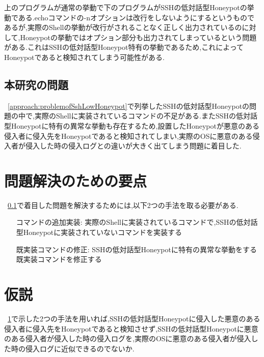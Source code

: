 上のプログラムが通常の挙動で下のプログラムがSSHの低対話型Honeypotの挙動である.echoコマンドの-nオプションは改行をしないようにするというものであるが,実際のShellの挙動が改行がされることなく正しく出力されているのに対して,Honeypotの挙動ではオプション部分も出力されてしまっているという問題がある.これはSSHの低対話型Honeypot特有の挙動であるため,これによってHoneypotであると検知されてしまう可能性がある.


\subsection{本研究の問題}
\label{approach:subproblem}
~\ref{approach:problemofSshLowHoneypot}で列挙したSSHの低対話型Honeypotの問題の中で,実際のShellに実装されているコマンドの不足がある.またSSHの低対話型Honeypotに特有の異常な挙動も存在するため,設置したHoneypotが悪意のある侵入者に侵入先をHoneypotであると検知されてしまい,実際のOSに悪意のある侵入者が侵入した時の侵入ログとの違いが大きく出てしまう問題に着目した.

\section{問題解決のための要点}
\label{approach:YotenForProblem}
~\ref{approach:subproblem}で着目した問題を解決するためには,以下2つの手法を取る必要がある.

\begin{itemize}
\setlength{\leftskip}{3.2cm}
 \item[コマンドの追加実装:] 実際のShellに実装されているコマンドで,SSHの低対話型Honeypotに実装されていないコマンドを実装する
 \item[既実装コマンドの修正:] SSHの低対話型Honeypotに特有の異常な挙動をする既実装コマンドを修正する
\end{itemize}


\section{仮説}
\label{approach:Hypothesis}
~\ref{approach:YotenForProblem}で示した2つの手法を用いれば,SSHの低対話型Honeypotに侵入した悪意のある侵入者に侵入先をHoneypotであると検知させず,SSHの低対話型Honeypotに悪意のある侵入者が侵入した時の侵入ログを,実際のOSに悪意のある侵入者が侵入した時の侵入ログに近似できるのでないか.

